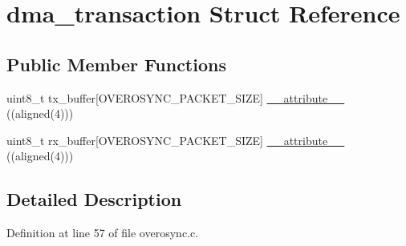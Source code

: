 \hypertarget{structdma__transaction}{\section{dma\-\_\-transaction \-Struct \-Reference}
\label{structdma__transaction}
}
\subsection*{\-Public \-Member \-Functions}
\begin{DoxyCompactItemize}
\item 
uint8\-\_\-t tx\-\_\-buffer\mbox{[}\-O\-V\-E\-R\-O\-S\-Y\-N\-C\-\_\-\-P\-A\-C\-K\-E\-T\-\_\-\-S\-I\-Z\-E\mbox{]} \hyperlink{structdma__transaction_af9dac354296543c3960057020bf0f84d}{\-\_\-\-\_\-attribute\-\_\-\-\_\-} ((aligned(4)))
\item 
uint8\-\_\-t rx\-\_\-buffer\mbox{[}\-O\-V\-E\-R\-O\-S\-Y\-N\-C\-\_\-\-P\-A\-C\-K\-E\-T\-\_\-\-S\-I\-Z\-E\mbox{]} \hyperlink{structdma__transaction_a055dbe16d1b8d2cb21a9ba3338d93387}{\-\_\-\-\_\-attribute\-\_\-\-\_\-} ((aligned(4)))
\end{DoxyCompactItemize}


\subsection{\-Detailed \-Description}


\-Definition at line 57 of file overosync.\-c.



